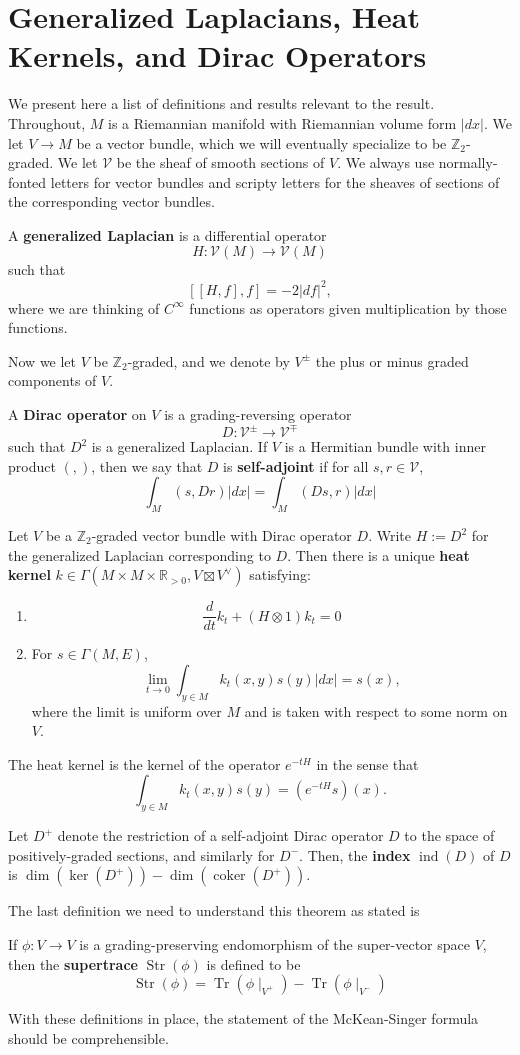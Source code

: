 \documentclass[11pt]{amsart}
\newcommand{\Z}{\mathbb Z}
\newcommand{\mbb}{\mathbb}
\newcommand{\R}{\mbb R}
\DeclareMathOperator{\Tr}{Tr} \DeclareMathOperator{\Cyc}{Cyc}
\numberwithin{equation}{section}
\newcommand\ind{\operatorname{ind}}
\newcommand\Str{\operatorname{Str}}
\newcommand\coker{\operatorname{coker}}
\begin{document}
\section{Generalized Laplacians, Heat Kernels, and Dirac Operators}
We present here a list of definitions and results relevant to the result. Throughout, $M$ is a Riemannian manifold with Riemannian volume form $|dx|$. We let $V\to M$ be a vector bundle, which we will eventually specialize to be $\Z_2$-graded. We let $\mathscr V$ be the sheaf of smooth sections of $V$. We always use normally-fonted letters for vector bundles and scripty letters for the sheaves of sections of the corresponding vector bundles.
\begin{definition}
	A \textbf{generalized Laplacian} is a differential operator
	\[
	H:\mathscr V(M) \to \mathscr V(M)
	\]
	such that 
	\[
	[[H,f],f] = -2|df|^2,
	\]
	where we are thinking of $C^\infty$ functions as operators given multiplication by those functions.
\end{definition}
Now we let $V$ be $\Z_2$-graded, and we denote by $V^{\pm}$ the plus or minus graded components of $V$.
\begin{definition}
	A \textbf{Dirac operator} on $V$ is a grading-reversing operator
	\[
	D: \mathscr V^\pm \to \mathscr V^\mp
	\]
	such that $D^2$ is a generalized Laplacian. If $V$ is a Hermitian bundle with inner product $(,)$, then we say that $D$ is \textbf{self-adjoint} if for all $s,r\in \mathscr V$, 
	\[
	\int_M (s,Dr)|dx| = \int_M(Ds,r)|dx|
	\]
\end{definition}
\begin{theorem}
	Let $V$ be a $\Z_2$-graded vector bundle with Dirac operator $D$. Write $H:=D^2$ for the generalized Laplacian corresponding to $D$. Then there is a unique \textbf{heat kernel} $k \in \Gamma(M\times M\times \R_{>0},V\boxtimes V^\vee)$ satisfying: 
	\begin{enumerate}
		\item 
		\[
		\frac{d}{dt}k_t + (H\otimes 1)k_t = 0
		\]
		\item For $s\in \Gamma(M, E)$,
		\[
		\lim_{t\to 0}\int_{y\in M} k_t(x,y) s(y) |dx| = s(x),
		\]
		where the limit is uniform over $M$ and is taken with respect to some norm on $V$.
	\end{enumerate}
	The heat kernel is the kernel of the operator $e^{-tH}$ in the sense that 
	\[
	\int_{y\in M} k_t(x,y)s(y) = (e^{-tH}s)(x).
	\]
\end{theorem}
\begin{definition}
	Let $D^+$ denote the restriction of a self-adjoint Dirac operator $D$ to the space of positively-graded sections, and similarly for $D^-$. Then, the \textbf{index} $\ind(D)$ of $D$ is $\dim(\ker(D^+))-\dim(\coker(D^+))$.
\end{definition}
The last definition we need to understand this theorem as stated is 
\begin{definition}
	If $\phi: V\to V$ is a grading-preserving endomorphism of the super-vector space $V$, then the \textbf{supertrace} $\Str(\phi)$ is defined to be 
	\[
	\Str(\phi) = \Tr(\phi\mid_{V^+})-\Tr(\phi\mid_{V^-})
	\]
\end{definition}
With these definitions in place, the statement of the McKean-Singer formula should be comprehensible. 
\end{document}
